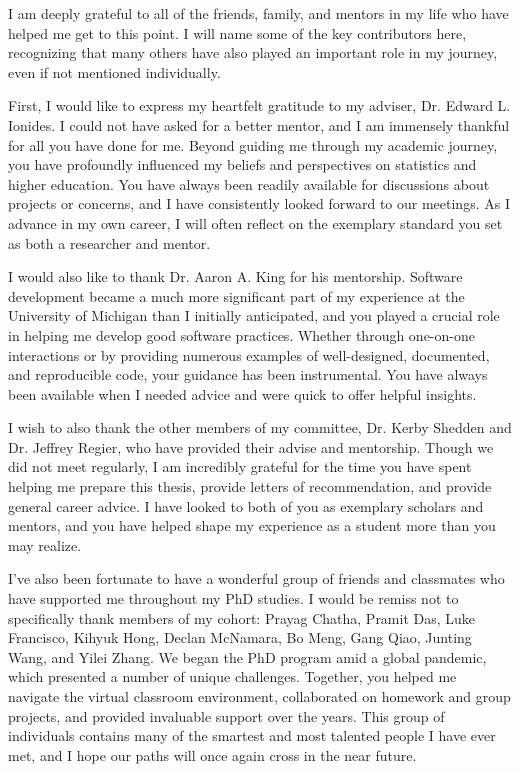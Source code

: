 I am deeply grateful to all of the friends, family, and mentors in my life who have helped me get to this point.
I will name some of the key contributors here, recognizing that many others have also played an important role in my journey, even if not mentioned individually.

First, I would like to express my heartfelt gratitude to my adviser, Dr. Edward L. Ionides.
I could not have asked for a better mentor, and I am immensely thankful for all you have done for me.
Beyond guiding me through my academic journey, you have profoundly influenced my beliefs and perspectives on statistics and higher education.
You have always been readily available for discussions about projects or concerns, and I have consistently looked forward to our meetings.
As I advance in my own career, I will often reflect on the exemplary standard you set as both a researcher and mentor.

I would also like to thank Dr. Aaron A. King for his mentorship. 
Software development became a much more significant part of my experience at the University of Michigan than I initially anticipated, and you played a crucial role in helping me develop good software practices. 
Whether through one-on-one interactions or by providing numerous examples of well-designed, documented, and reproducible code, your guidance has been instrumental.
You have always been available when I needed advice and were quick to offer helpful insights.

I wish to also thank the other members of my committee, Dr. Kerby Shedden and Dr. Jeffrey Regier, who have provided their advise and mentorship.
Though we did not meet regularly, I am incredibly grateful for the time you have spent helping me prepare this thesis, provide letters of recommendation, and provide general career advice.
I have looked to both of you as exemplary scholars and mentors, and you have helped shape my experience as a student more than you may realize.

I've also been fortunate to have a wonderful group of friends and classmates who have supported me throughout my PhD studies.
I would be remiss not to specifically thank members of my cohort: Prayag Chatha, Pramit Das, Luke Francisco, Kihyuk Hong, Declan McNamara, Bo Meng, Gang Qiao, Junting Wang, and Yilei Zhang.
We began the PhD program amid a global pandemic, which presented a number of unique challenges.
Together, you helped me navigate the virtual classroom environment, collaborated on homework and group projects, and provided invaluable support over the years.
This group of individuals contains many of the smartest and most talented people I have ever met, and I hope our paths will once again cross in the near future.


